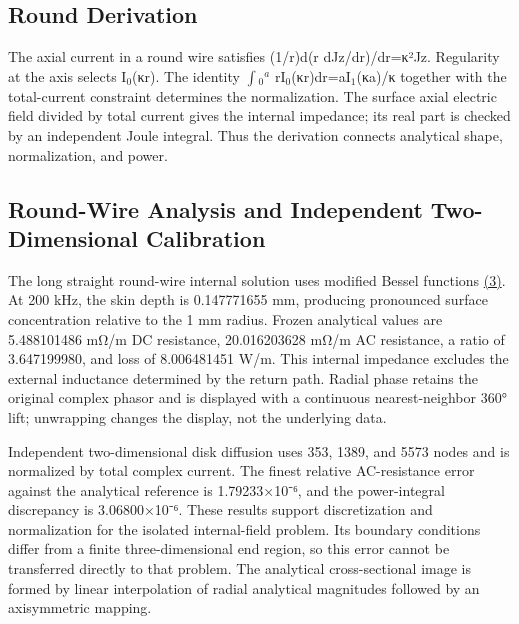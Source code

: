 \documentclass[11pt]{article}
\begin{document}
\subsection*{Round Derivation}
\hypertarget{03.round_derivation.heading}{}
The axial current in a round wire satisfies (1/r)d(r dJz/dr)/dr=κ²Jz. Regularity at the axis selects I\(_0\)(κr). The identity \(\int\)\(_0\)\(^a\) rI\(_0\)(κr)dr=aI\(_1\)(κa)/κ together with the total-current constraint determines the normalization. The surface axial electric field divided by total current gives the internal impedance; its real part is checked by an independent Joule integral. Thus the derivation connects analytical shape, normalization, and power.


\subsection*{Round-Wire Analysis and Independent Two-Dimensional Calibration}
\hypertarget{03.analytic.heading}{}
The long straight round-wire internal solution uses modified Bessel functions \href{report_en_single.pdf#E03}{(3)}. At 200 kHz, the skin depth is 0.147771655 mm, producing pronounced surface concentration relative to the 1 mm radius. Frozen analytical values are 5.488101486 mΩ/m DC resistance, 20.016203628 mΩ/m AC resistance, a ratio of 3.647199980, and loss of 8.006481451 W/m. This internal impedance excludes the external inductance determined by the return path. Radial phase retains the original complex phasor and is displayed with a continuous nearest-neighbor 360° lift; unwrapping changes the display, not the underlying data.


Independent two-dimensional disk diffusion uses 353, 1389, and 5573 nodes and is normalized by total complex current. The finest relative AC-resistance error against the analytical reference is 1.79233×10⁻⁶, and the power-integral discrepancy is 3.06800×10⁻⁶. These results support discretization and normalization for the isolated internal-field problem. Its boundary conditions differ from a finite three-dimensional end region, so this error cannot be transferred directly to that problem. The analytical cross-sectional image is formed by linear interpolation of radial analytical magnitudes followed by an axisymmetric mapping.
\end{document}
